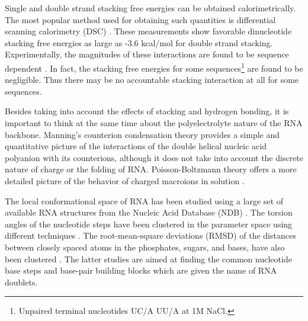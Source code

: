 Single and double strand stacking free energies can be obtained
calorimetrically. The most popular method used for obtaining such
quantities is differential scanning calorimetry (DSC)
\cite{marky1982}. These measurements show favorable dinucleotide
stacking free energies as large as -3.6 kcal/mol for double strand
stacking. Experimentally, the magnitudes of these interactions are
found to be sequence dependent \cite{bloomfield2000}. In fact, the
stacking free energies for some sequences\footnote{Unpaired terminal
 nucleotides UC/A  UU/A  at 1M NaCl.} are found to be negligible. Thus
there may be no accountable stacking interaction at all for some sequences.

Besides taking into account the effects of stacking and hydrogen
bonding, it is important to think at the same time about the
polyelectrolyte nature of the RNA backbone. Manning's counterion
condensation theory \cite{manning1977, manning2003} provides a
simple and quantitative picture of the interactions of the double
helical nucleic acid polyanion with its counterions, although it
does not take into account the discrete nature of charge
\cite{bloomfield2000} or the folding of RNA. Poisson-Boltzmann
theory offers a more detailed picture of the behavior of charged
macroions in solution \cite{antypov2005}.

The local conformational space of RNA has been studied using a large
set of available RNA structures from the Nucleic Acid Database
(NDB) \cite{berman1992}. The torsion angles of the nucleotide steps have been
clustered in the parameter space using different techniques
\cite{murray2003, schneider2004}. The root-mean-square deviations
(RMSD) of the distances between closely spaced atoms in the
phosphates, sugars, and bases, have also been clustered
\cite{sykes2005}. The latter studies are aimed at finding the common
nucleotide base steps and base-pair building blocks which are given
the name of RNA doublets.


